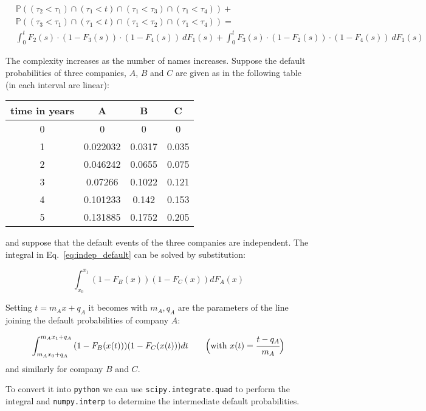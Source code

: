\begin{equation}
\begin{split}
&\mathbb{P}((\tau_2\lt\tau_1)\cap (\tau_1\lt t)\cap (\tau_1\lt\tau_3)\cap (\tau_1\lt\tau_4)) +\\
&\mathbb{P}((\tau_3\lt\tau_1)\cap (\tau_1\lt t)\cap (\tau_1\lt\tau_2)\cap (\tau_1\lt\tau_4)) =\\
&\int_0^t{F_2 (s)\cdot (1-F_3 (s)) \cdot (1-F_4 (s))~dF_1(s)} +  \int_0^t{F_3 (s)\cdot (1-F_2 (s)) \cdot (1-F_4 (s))~dF_1(s)}
\end{split}
\label{eq:indep_default}
\end{equation}

The complexity increases as the number of names increases. 
Suppose the default probabilities of three companies, $A$, $B$ and $C$ are
given as in the following table (in each interval are linear):

\begin{center}
	\begin{tabular}{|c|c|c|c|}
		time in years & A & B & C \\
		\hline
		0 & 0 & 0 & 0 \\
		1 & 0.022032 & 0.0317 & 0.035 \\
		2 & 0.046242 & 0.0655 & 0.075 \\
		3 & 0.07266 & 0.1022 & 0.121 \\
		4 & 0.101233 & 0.142 & 0.153 \\
		5 & 0.131885 & 0.1752 & 0.205 \\
	\end{tabular}
\end{center}
and suppose that the default events of the three companies are
independent. The integral in Eq.~\ref{eq:indep_default} can be solved by substitution:

\[ \int_{x_0}^{x_1}{(1-F_B(x))(1-F_C(x))dF_A(x)}\]

Setting \(t=m_A x + q_A\) it becomes with \(m_A, q_A\) are the
parameters of the line joining the default probabilities of company $A$:

\[ \int_{m_A x_0 + q_A}^{m_A x_1 + q_A}{(1-F_B(x(t)))(1-F_C(x(t)))dt}~~~~~~\Big(\textrm{with}~x(t) = \cfrac{t -q_A}{m_A}\Big) \]
and similarly for company $B$ and $C$.

To convert it into \texttt{python} we can use \texttt{scipy.integrate.quad} to
perform the integral and \texttt{numpy.interp} to determine the
intermediate default probabilities.

